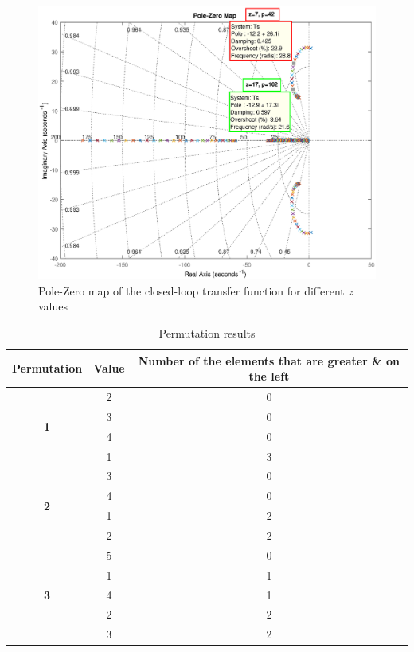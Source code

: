 \begin{figure}[thpb]
	\centering	
	\includegraphics[width=0.5\linewidth]{./fig/Q01_A_pzmap.eps}
	\caption{Pole-Zero map of the closed-loop transfer function for different $z$ values}
	\label{fig:Q01_A_pzmap} 
\end{figure}


\begin{table}[thpb]
	\centering
	\caption{Permutation results}
	\label{tab:problem14}
	\begin{tabular}{|c|c|c|}
		\hline
		\textbf{Permutation}        & \textbf{Value} & \textbf{Number of the elements that are greater \& on the left} \\ \hline
		\multirow{4}{*}{\textbf{1}} & 2              & 0                                                               \\ \cline{2-3} 
		& 3              & 0                                                               \\ \cline{2-3} 
		& 4              & 0                                                               \\ \cline{2-3} 
		& 1              & 3                                                               \\ \hline
		\multirow{4}{*}{\textbf{2}} & 3              & 0                                                               \\ \cline{2-3} 
		& 4              & 0                                                               \\ \cline{2-3} 
		& 1              & 2                                                               \\ \cline{2-3} 
		& 2              & 2                                                               \\ \hline
		\multirow{5}{*}{\textbf{3}} & 5              & 0                                                               \\ \cline{2-3} 
		& 1              & 1                                                               \\ \cline{2-3} 
		& 4              & 1                                                               \\ \cline{2-3} 
		& 2              & 2                                                               \\ \cline{2-3} 
		& 3              & 2                                                               \\ \hline
	\end{tabular}
\end{table}